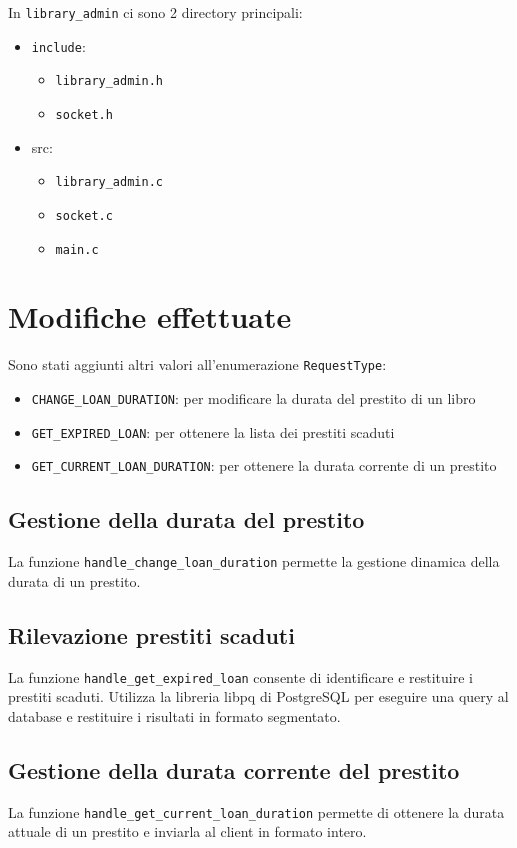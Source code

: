 \documentclass[]{report}
\begin{document}
\noindent
In \texttt{library\_admin} ci sono 2 directory principali:
\begin{itemize}
	\item \texttt{include}:
	      \begin{itemize}
		      \item \texttt{library\_admin.h}
		      \item \texttt{socket.h}
	      \end{itemize}
	\item src:
	      \begin{itemize}
		      \item \texttt{library\_admin.c}
		      \item \texttt{socket.c}
		      \item \texttt{main.c}
	      \end{itemize}
\end{itemize}

\section{Modifiche effettuate}
Sono stati aggiunti altri valori all'enumerazione \texttt{RequestType}:
\begin{itemize}
	\item \texttt{CHANGE\_LOAN\_DURATION}: per modificare la durata del prestito di un libro
	\item \texttt{GET\_EXPIRED\_LOAN}: per ottenere la lista dei prestiti scaduti
	\item \texttt{GET\_CURRENT\_LOAN\_DURATION}: per ottenere la durata corrente di un prestito
\end{itemize}

\subsection{Gestione della durata del prestito}
La funzione \texttt{handle\_change\_loan\_duration} permette la gestione dinamica della durata di un prestito.

\subsection{Rilevazione prestiti scaduti}
La funzione \texttt{handle\_get\_expired\_loan} consente di identificare e restituire i prestiti scaduti. Utilizza la libreria libpq di PostgreSQL per eseguire una query al database e restituire i risultati in formato segmentato.

\subsection{Gestione della durata corrente del prestito}
La funzione \texttt{handle\_get\_current\_loan\_duration} permette di ottenere la durata attuale di un prestito e inviarla al client in formato intero.
\end{document}
